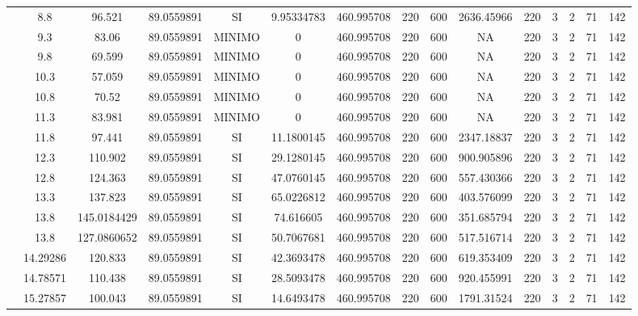 \begin{table}[H]
{\begin{tabular}{|c|c|c|c|c|c|c|c|c|c|c|c|c|c|c|}
\cline{2-15}    & 8.8 & 96.521 & 89.0559891 & SI  & 9.95334783 & 460.995708 & 220 & 600 & 2636.45966 & 220 & 3   & 2   & 71  & 142 \bigstrut\\
\cline{2-15}    & 9.3 & 83.06 & 89.0559891 & MINIMO & 0   & 460.995708 & 220 & 600 & NA  & 220 & 3   & 2   & 71  & 142 \bigstrut\\
\cline{2-15}    & 9.8 & 69.599 & 89.0559891 & MINIMO & 0   & 460.995708 & 220 & 600 & NA  & 220 & 3   & 2   & 71  & 142 \bigstrut\\
\cline{2-15}    & 10.3 & 57.059 & 89.0559891 & MINIMO & 0   & 460.995708 & 220 & 600 & NA  & 220 & 3   & 2   & 71  & 142 \bigstrut\\
\cline{2-15}    & 10.8 & 70.52 & 89.0559891 & MINIMO & 0   & 460.995708 & 220 & 600 & NA  & 220 & 3   & 2   & 71  & 142 \bigstrut\\
\cline{2-15}    & 11.3 & 83.981 & 89.0559891 & MINIMO & 0   & 460.995708 & 220 & 600 & NA  & 220 & 3   & 2   & 71  & 142 \bigstrut\\
\cline{2-15}    & 11.8 & 97.441 & 89.0559891 & SI  & 11.1800145 & 460.995708 & 220 & 600 & 2347.18837 & 220 & 3   & 2   & 71  & 142 \bigstrut\\
\cline{2-15}    & 12.3 & 110.902 & 89.0559891 & SI  & 29.1280145 & 460.995708 & 220 & 600 & 900.905896 & 220 & 3   & 2   & 71  & 142 \bigstrut\\
\cline{2-15}    & 12.8 & 124.363 & 89.0559891 & SI  & 47.0760145 & 460.995708 & 220 & 600 & 557.430366 & 220 & 3   & 2   & 71  & 142 \bigstrut\\
\cline{2-15}    & 13.3 & 137.823 & 89.0559891 & SI  & 65.0226812 & 460.995708 & 220 & 600 & 403.576099 & 220 & 3   & 2   & 71  & 142 \bigstrut\\
\cline{2-15}    & 13.8 & 145.0184429 & 89.0559891 & SI  & 74.616605 & 460.995708 & 220 & 600 & 351.685794 & 220 & 3   & 2   & 71  & 142 \bigstrut\\
\cline{2-15}    & 13.8 & 127.0860652 & 89.0559891 & SI  & 50.7067681 & 460.995708 & 220 & 600 & 517.516714 & 220 & 3   & 2   & 71  & 142 \bigstrut\\
\cline{2-15}    & 14.29286 & 120.833 & 89.0559891 & SI  & 42.3693478 & 460.995708 & 220 & 600 & 619.353409 & 220 & 3   & 2   & 71  & 142 \bigstrut\\
\cline{2-15}    & 14.78571 & 110.438 & 89.0559891 & SI  & 28.5093478 & 460.995708 & 220 & 600 & 920.455991 & 220 & 3   & 2   & 71  & 142 \bigstrut\\
\cline{2-15}    & 15.27857 & 100.043 & 89.0559891 & SI  & 14.6493478 & 460.995708 & 220 & 600 & 1791.31524 & 220 & 3   & 2   & 71  & 142 \bigstrut\\

\end{tabular}}
\end{table}
